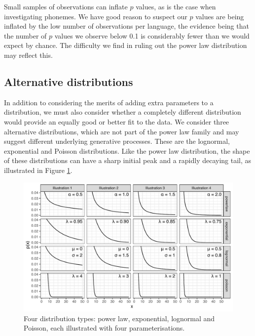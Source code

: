 Small samples of observations can inflate \(p\) values, as is the case when investigating phonemes. We have good reason to suspect our \(p\) values are being inflated by the low number of observations per language, the evidence being that the number of \(p\) values we observe below 0.1 is considerably fewer than we would expect by chance. The difficulty we find in ruling out the power law distribution may reflect this.

\hypertarget{alternative-distributions}{%
\subsection{Alternative distributions}\label{alternative-distributions}}

In addition to considering the merits of adding extra parameters to a distribution, we must also consider whether a completely different distribution would provide an equally good or better fit to the data. We consider three alternative distributions, which are not part of the power law family and may suggest different underlying generative processes. These are the lognormal, exponential and Poisson distributions. Like the power law distribution, the shape of these distributions can have a sharp initial peak and a rapidly decaying tail, as illustrated in Figure \ref{fig:Figure-3}.

\begin{figure}

{\centering \includegraphics[width=180mm]{03-phoneme-frequencies/fig/Fig3_distribution_illustrations} 

}

\caption[Illustrations of power law, exponential, lognormal and Poisson distributions]{Four distribution types: power law, exponential, lognormal and Poisson, each illustrated with four parameterisations.}\label{fig:Figure-3}
\end{figure}

